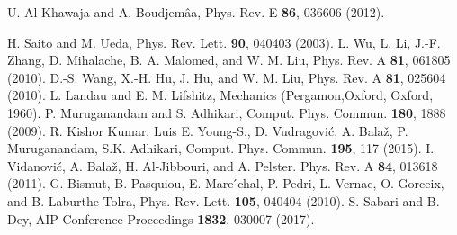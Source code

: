 \documentclass[amsmath,amssymb,article,twocolumn,superscriptaddress,showpacs,10pt]{revtex4-1}
\begin{document}
\begin{thebibliography}{99}
 U. Al Khawaja and A. Boudjem\^aa, Phys. Rev. E \textbf{86}, 036606 (2012).

 H. Saito and M. Ueda, Phys. Rev. Lett. \textbf{90}, 040403 (2003).
 L. Wu, L. Li, J.-F. Zhang, D. Mihalache, B. A. Malomed, and W. M. Liu, Phys. Rev. A \textbf{81}, 061805 (2010).
 D.-S. Wang, X.-H. Hu, J. Hu, and W. M. Liu, Phys. Rev. A \textbf{81}, 025604 (2010).
 L. Landau and E. M. Lifshitz, Mechanics (Pergamon,Oxford, Oxford, 1960).
 P. Muruganandam and S. Adhikari, Comput. Phys. Commun. \textbf{180}, 1888 (2009).
R. Kishor Kumar, Luis E. Young-S., D. Vudragovi\'{c}, A. Bala\v{z}, P. Muruganandam, S.K. Adhikari, Comput. Phys. Commun. \textbf{195}, 117 (2015).
 I. Vidanovi\'c, A. Bala\v{z}, H. Al-Jibbouri, and A. Pelster. Phys. Rev. A \textbf{84}, 013618 (2011). 
 G. Bismut, B. Pasquiou, E. Mare ́chal, P. Pedri, L. Vernac, O. Gorceix, and B. Laburthe-Tolra, Phys. Rev. Lett. \textbf{105}, 040404 (2010).
 S. Sabari and B. Dey, AIP Conference Proceedings \textbf{1832}, 030007 (2017).

\end{thebibliography}%
\end{document}
